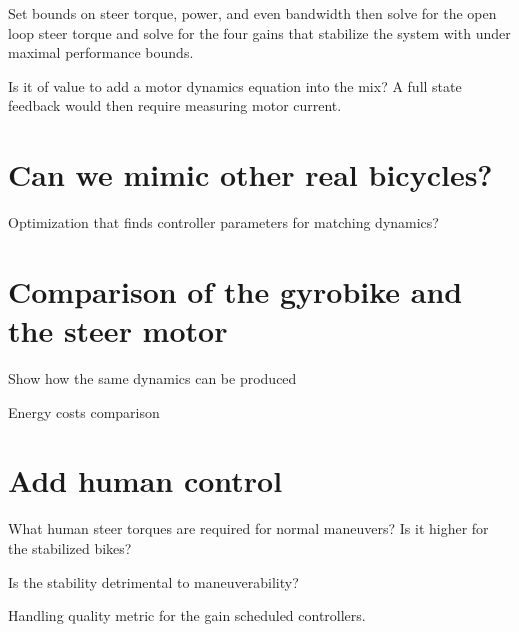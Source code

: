 \documentclass[12pt]{article}
\begin{document}
Set bounds on steer torque, power, and even bandwidth then solve for the open
loop steer torque and solve for the four gains that stabilize the system with
under maximal performance bounds.

Is it of value to add a motor dynamics equation into the mix? A full state
feedback would then require measuring motor current.

\section{Can we mimic other real bicycles?}

Optimization that finds controller parameters for matching dynamics?

\section{Comparison of the gyrobike and the steer motor}

Show how the same dynamics can be produced

Energy costs comparison

\section{Add human control}

What human steer torques are required for normal maneuvers? Is it higher for the
stabilized bikes?

Is the stability detrimental to maneuverability?

Handling quality metric for the gain scheduled controllers.



\end{document}
